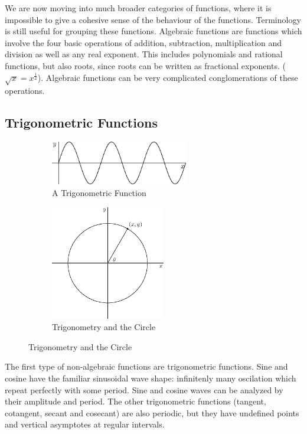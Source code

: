 \documentclass[fleqn]{report}
\begin{document}
We are now moving into much broader categories of functions,
where it is impossible to give a cohesive sense of the
behaviour of the functions. Terminology is still useful for
grouping these functions. Algebraic functions are
functions which involve the four basic operations of addition,
subtraction, multiplication and division as well as any real
exponent. This includes polynomials and rational functions,
but also roots, since roots can be written as fractional
exponents. ($\sqrt{x} = x^{\frac{1}{2}}$). Algebraic
functions can be very complicated conglomerations of these
operations. 

\subsection{Trigonometric Functions}
\label{trig-functions}

\begin{figure}[b]
\centering
\begin{subfigure}{.5\textwidth}
 \centering
 \includegraphics[width=6cm]{figure32.eps}
 \caption{A Trigonometric Function}
\end{subfigure}%
\begin{subfigure}{.5\textwidth}
 \centering
 \includegraphics[width=5cm]{figure34.eps}
 \caption{Trigonometry and the Circle}
\end{subfigure}
\label{figure-grigonometric-functions}
\end{figure}

The first type of non-algebraic functions are trigonometric
functions.  Sine and cosine have the familiar sinusoidal wave
shape: infinitenly many oscilation which repeat perfectly
with some period. Sine and cosine waves can be analyzed by
their amplitude and period. The other trigonometric functions
(tangent, cotangent, secant and cosecant) are also periodic,
but they have undefined points and vertical asymptotes at
regular intervals. 
\end{document}

